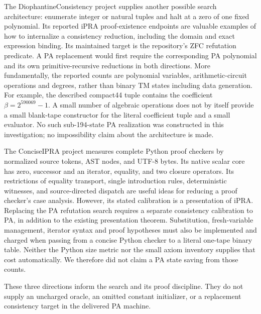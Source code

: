 The DiophantineConsistency project supplies another possible search
architecture: enumerate integer or natural tuples and halt at a zero
of one fixed polynomial. Its reported iPRA proof-existence endpoints
are valuable examples of how to internalize a consistency reduction,
including the domain and exact expression binding. Its maintained
target is the repository's ZFC refutation predicate. A PA replacement
would first require the corresponding PA polynomial and its own
primitive-recursive reductions in both directions. More fundamentally,
the reported counts are polynomial variables, arithmetic-circuit
operations and degrees, rather than binary TM states including data
generation. For example, the described compact44 tuple contains the
coefficient $\beta=2^{590069}-1$. A small number of algebraic operations
does not by itself provide a small blank-tape constructor for the literal
coefficient tuple and a small evaluator. No such sub-194-state PA
realization was constructed in this investigation; no impossibility
claim about the architecture is made.

The ConciseIPRA project measures complete Python proof checkers by
normalized source tokens, AST nodes, and UTF-8 bytes. Its native scalar
core has zero, successor and an iterator, equality, and two closure
operators. Its restrictions of equality transport, single introduction
rules, deterministic witnesses, and source-directed dispatch are useful
ideas for reducing a proof checker's case analysis. However, its stated
calibration is a presentation of iPRA. Replacing the PA refutation search
requires a separate consistency calibration to PA, in addition to the
existing presentation theorem. Substitution, fresh-variable management,
iterator syntax and proof hypotheses must also be implemented and
charged when passing from a concise Python checker to a literal
one-tape binary table. Neither the Python size metric nor the small
axiom inventory supplies that cost automatically. We therefore did not
claim a PA state saving from those counts.

These three directions inform the search and its proof discipline.
They do not supply an uncharged oracle, an omitted constant initializer,
or a replacement consistency target in the delivered PA machine.
